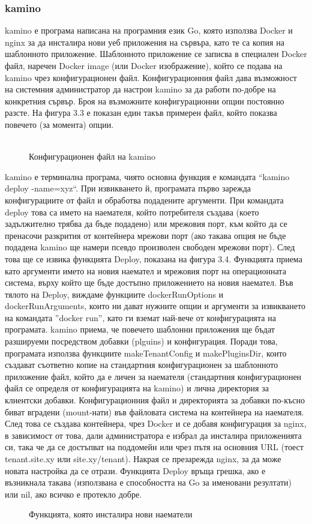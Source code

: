 \documentclass[pdftex,14pt,a4paper]{extreport}
\begin{document}
\subsubsection {kamino}
kamino е програма написана на програмния език Go, която използва Docker и nginx за да инсталира нови уеб приложения на сървъра, като те са копия на шаблонното приложение. Шаблонното приложение се записва в специален Docker файл, наречен Docker image (или Docker изображение), който се подава на kamino чрез конфигурационен файл. Конфигурационния файл дава възможност на системния администратор да настрои kamino за да работи по-добре на конкретния сървър. Броя на възможните конфигурационни опции постоянно разсте. На фигура 3.3 е показан един такъв примерен файл, който показва повечето (за момента) опции. \\\\
\begin{figure}[h!]
  
  \caption{Конфигурационен файл на kamino}
\end{figure}
kamino е терминална програма, чиято основна функция е командата ``kamino deploy -name=xyz``. При извикването й, програмата първо зарежда конфигурациите от файл и обработва подадените аргументи. При командата deploy това са името на наемателя, който потребителя създава (което задължително трябва да бъде подадено) или мрежовия порт, към който да се пренасочи разкрития от контейнера мрежови порт (ако такава опция не бъде подадена kamino ще намери псевдо произволен свободен мрежови порт). След това ще се извика функцията Deploy, показана на фигура 3.4. Функцията приема като аргументи името на новия наемател и мрежовия порт на операционната система, върху който ще бъде достъпно приложението на новия наемател. Във тялото на Deploy, виждаме функциите dockerRunOptions и dockerRunArguments, които ни дават нужните опции и аргументи за извикването на командата ''docker run'', като ги вземат най-вече от конфигурацията на програмата. kamino приема, че повечето шаблонни приложения ще бъдат разшируеми посредством добавки (plguins) и конфигурация. Поради това, програмата използва функциите makeTenantConfig и makePluginsDir, които създават съответно копие на стандартния конфигурационен за шаблонното приложение файл, който да е личен за наемателя (стандартния конфигурационен файл се определя от конфигурацията на kamino) и лична директория за клиентски добавки. Конфигурационния файл и директорията за добавки по-късно биват вградени (mount-нати) във файловата система на контейнера на наемателя. След това се създава контейнера, чрез Docker и се добавя конфигурация за nginx, в зависимост от това, дали администратора е избрал да инсталира приложенията си, така че да се достъпват на поддомейн или чрез пътя на основния URL (тоест tenant.site.xy или site.xy/tenant). Накрая се презарежда nginx, за да може новата настройка да се отрази. Функцията Deploy връща грешка, ако е възникнала такава (използвана е способността на Go за именовани резултати) или nil, ако всичко е протекло добре.
\begin{figure}[h!]
  
  \caption{Функцията, която инсталира нови наематели}
\end{figure}
\end{document}
